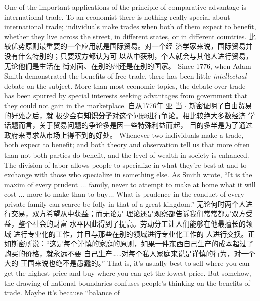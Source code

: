 \begin{paracol}{2}
One of the important applications of the principle of comparative advantage is international trade. To an economist there is
nothing really special about international trade; individuals
make trades when both of them expect to benefit, whether they
live across the street, in different states, or in different countries.
\switchcolumn
比较优势原则最重要的一个应用就是国际贸易。对一个经
济学家来说，国际贸易并没有什么特别的；只要双方都认为可
以从中获利，个人就会与其他人进行贸易，无论他们是生活在
街对面、在别的州还是在别的国家。
\switchcolumn*
Since 1776, when Adam Smith demonstrated the benefits of
free trade, there has been little \textit{intellectual} debate on the subject.
More than most economic topics, the debate over trade has
been spurred by special interests seeking advantages from government that they could not gain in the marketplace.
\switchcolumn
自从1776年 亚 当 $\cdot$ 斯密证明了自由贸易的好处之后，就
极少会有\textbf{知识分子}对这个问题进行争论。相比较绝大多数经济
学话题而言，关于贸易问题的争论多是因一些特殊利益而起，
目的多半是为了通过政府来寻求从市场上得不到的好处。
\switchcolumn*
Whenever two individuals make a trade, both expect to benefit; and both theory and observation tell us that more often
than not both parties do benefit, and the level of wealth in society is enhanced. The division of labor allows people to specialize
in what they're best at and to exchange with those who specialize in something else. As Smith wrote, ``It is the maxim of every
prudent $\ldots$ family, never to attempt to make at home what it
will cost $\ldots$ more to make than to buy$\ldots$ What is prudence
in the conduct of every private family can scarce be folly in that
of a great kingdom.''
\switchcolumn
无论何时两个人进行交易，双方希望从中获益；而无论是
理论还是观察都告诉我们常常都是双方受益，整个社会的财富
水平因此得到了提高。劳动分工让人们能够在他最擅长的领域
进行专业化的工作，并且与那些在别的领域进行专业化工作的
人进行交换。正如斯密所说：“这是每个谨慎的家庭的原则，如果一件东西自己生产的成本超过了购买的价格，就永远不要
自己生产……对每个私人家庭来说是谨慎的行为，对一个大的
王国来说也绝不是愚蠢的。”
\switchcolumn*
That is, it's usually best to sell where you can get the highest
price and buy where you can get the lowest price. But somehow, the drawing of national boundaries confuses people's
thinking on the benefits of trade. Maybe it's because ``balance of

\end{paracol}
